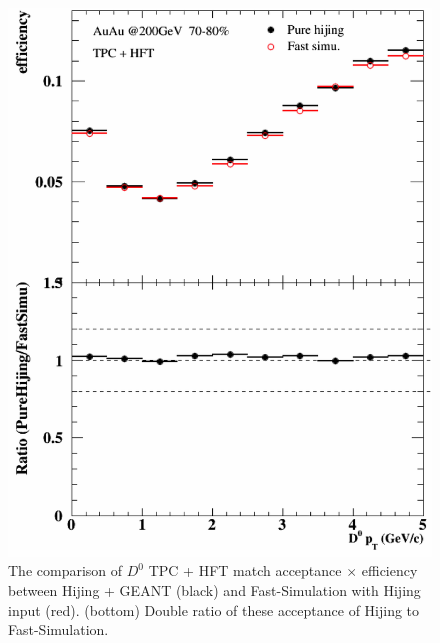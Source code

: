 \documentclass[a4paper]{article}
\begin{document}
\begin{figure}[htbp]
\begin{minipage}[htbp]{0.47\linewidth}
\centering
\includegraphics[width=1.0\textwidth,angle=0]{fig/70_80_2.png}
\caption{ The comparison of $D^0$ TPC + HFT match acceptance $\times$ efficiency between Hijing + GEANT (black) and Fast-Simulation with Hijing input (red). (bottom) Double ratio of these acceptance of Hijing to Fast-Simulation.\label{70_80_2}}
\end{minipage}
\hfill
\begin{minipage}[htbp]{0.47\linewidth}
\centering

\end{minipage}
\end{figure}
\end{document}
